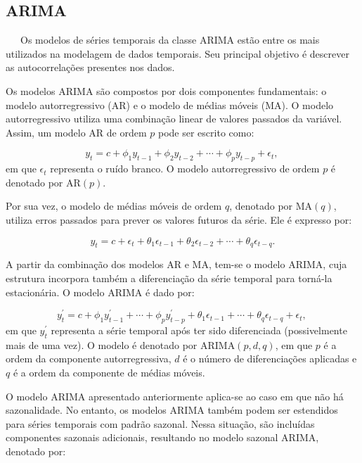 \documentclass[
  12pt,
  a4paper,
]{scrreprt}
\begin{document}
\subsection{ARIMA}\label{arima}

~~~Os modelos de séries temporais da classe ARIMA estão entre os mais
utilizados na modelagem de dados temporais. Seu principal objetivo é
descrever as autocorrelações presentes nos dados.

\vspace{12pt}

Os modelos ARIMA são compostos por dois componentes fundamentais: o
modelo autorregressivo (AR) e o modelo de médias móveis (MA). O modelo
autorregressivo utiliza uma combinação linear de valores passados da
variável. Assim, um modelo AR de ordem \(p\) pode ser escrito como:

\[
y_{t} = c + \phi_{1}y_{t-1} + \phi_{2}y_{t-2} + \cdots + \phi_{p}y_{t-p} + \epsilon_{t}\text{, }
\] em que \(\epsilon_{t}\) representa o ruído branco. O modelo
autorregressivo de ordem \(p\) é denotado por
\(\text{AR}\left(p\right)\).

\vspace{12pt}

Por sua vez, o modelo de médias móveis de ordem \(q\), denotado por
\(\text{MA}\left(q\right)\), utiliza erros passados para prever os
valores futuros da série. Ele é expresso por:

\[
y_{t} = c + \epsilon_{t} + \theta_{1}\epsilon_{t - 1} + \theta_{2}\epsilon_{t-2} + \cdots + \theta_{q}\epsilon_{t-q}\text{.}
\]

A partir da combinação dos modelos AR e MA, tem-se o modelo ARIMA, cuja
estrutura incorpora também a diferenciação da série temporal para
torná-la estacionária. O modelo ARIMA é dado por:

\[
y^{'}_{t} = c + \phi_{1}y^{'}_{t-1} + \cdots + \phi_{p}y^{'}_{t-p} + \theta_{1}\epsilon_{t-1}+ \cdots + \theta_{q}\epsilon_{t-q} + \epsilon_{t}\text{, }
\] em que \(y^{'}_t\) representa a série temporal após ter sido
diferenciada (possivelmente mais de uma vez). O modelo é denotado por
\(\text{ARIMA}\left(p, d, q\right)\), em que \(p\) é a ordem da
componente autorregressiva, \(d\) é o número de diferenciações aplicadas
e \(q\) é a ordem da componente de médias móveis.

\vspace{12pt}

O modelo ARIMA apresentado anteriormente aplica-se ao caso em que não há
sazonalidade. No entanto, os modelos ARIMA também podem ser estendidos
para séries temporais com padrão sazonal. Nessa situação, são incluídas
componentes sazonais adicionais, resultando no modelo sazonal ARIMA,
denotado por:
\end{document}
